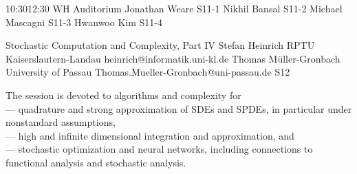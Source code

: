\documentclass[12pt,lettersize,oneside]{book} %
\begin{document}

\sessionPart{}%
{\hfill{}
{10:30}{12:30} %
{WH Auditorium}} %
{Jonathan Weare}
{S11-1}
{Nikhil Bansal}
{S11-2}
{Michael Mascagni}
{S11-3}
{Hwanwoo Kim}
{S11-4}



\clearpage

\begin{session}
 {Stochastic Computation and Complexity, Part IV}%
 {Stefan Heinrich}%
 {RPTU Kaiserslautern-Landau}%
 {heinrich@informatik.uni-kl.de}%
 {Thomas M\"uller-Gronbach}%
 {University of Passau}%
 {Thomas.Mueller-Gronbach@uni-passau.de}%
 {S12}%
 {}%

 The session is devoted to algorithms and complexity for\\
 --- quadrature and strong approximation of SDEs and SPDEs, in particular under nonstandard assumptions,\\
 --- high and infinite dimensional integration and approximation, and\\
 --- stochastic optimization and neural networks,
 including connections to functional analysis and stochastic analysis.
\end{session}


\end{document}
